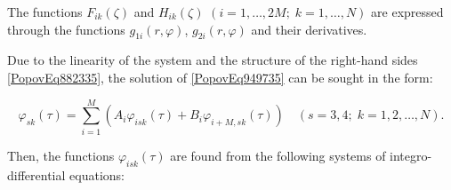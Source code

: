 \noindent The functions $F_{ik}(\zeta)$ and $H_{ik}(\zeta)$ $(i = 1, \dots, 2M;\; k = 1, \dots, N)$ are expressed through the functions $g_{1i}(r, \varphi)$, $g_{2i}(r, \varphi)$ and their derivatives.

Due to the linearity of the system and the structure of the right-hand sides \eqref{PopovEq882335}, the solution of \eqref{PopovEq949735} can be sought in the form:

\begin{equation} \label{31.55)}
	\varphi_{sk}(\tau) = \sum_{i=1}^{M} \left( A_i \varphi_{isk}(\tau) + B_i \varphi_{i+M,sk}(\tau) \right) \quad (s = 3, 4; \; k = 1, 2, \dots, N).
\end{equation}

\noindent Then, the functions $\varphi_{isk}(\tau)$ are found from the following systems of integro-differential equations:

